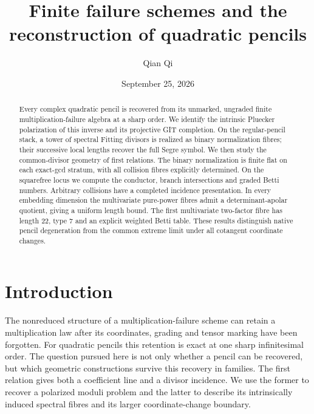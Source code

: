 \documentclass[11pt,reqno]{amsart}
\numberwithin{equation}{section}
\theoremstyle{definition}\newtheorem{definition}[theorem]{Definition}
\theoremstyle{remark}\newtheorem{remark}[theorem]{Remark}
\begin{document}
\title[Finite failure schemes and quadratic pencils]{Finite failure schemes and the reconstruction of quadratic pencils}
\author{Qian Qi}
\date{September 25, 2026}
\begin{abstract}
Every complex quadratic pencil is recovered from its unmarked,
ungraded finite multiplication-failure algebra at a sharp order.
We identify the intrinsic Pluecker polarization of this inverse and
its projective GIT completion. On the regular-pencil stack, a tower
of spectral Fitting divisors is realized as binary normalization
fibres; their successive local lengths recover the full Segre
symbol. We then study the common-divisor geometry of first relations.
The binary normalization is finite flat on each exact-gcd stratum,
with all collision fibres explicitly determined. On the squarefree
locus we compute the conductor, branch intersections and graded
Betti numbers. Arbitrary collisions have a completed incidence
presentation. In every embedding dimension the multivariate
pure-power fibres admit a determinant-apolar quotient, giving a
uniform length bound. The first multivariate two-factor fibre has
length 22, type 7 and an explicit weighted Betti table. These results
distinguish native pencil degeneration from the common extreme
limit under all cotangent coordinate changes.
\end{abstract}
\maketitle

\section{Introduction}
\label{sec:introduction-v153}
The nonreduced structure of a multiplication-failure scheme can
retain a multiplication law after its coordinates, grading and
tensor marking have been forgotten. For quadratic pencils this
retention is exact at one sharp infinitesimal order. The question
pursued here is not only whether a pencil can be recovered, but
which geometric constructions survive this recovery in families.
The first relation gives both a coefficient line and a divisor
incidence. We use the former to recover a polarized moduli problem
and the latter to describe its intrinsically induced spectral
fibres and its larger coordinate-change boundary.
\end{document}
